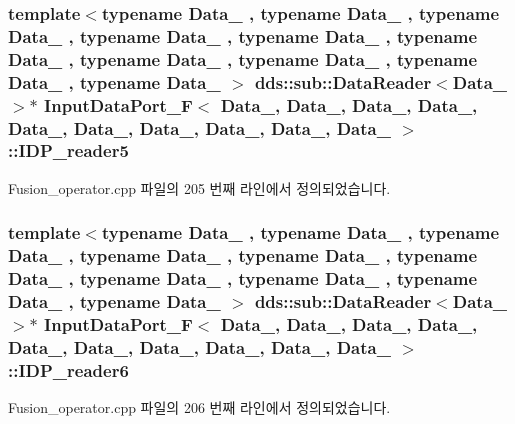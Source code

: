 \subsubsection[{\texorpdfstring{I\+D\+P\+\_\+reader5}{IDP_reader5}}]{\setlength{\rightskip}{0pt plus 5cm}template$<$typename Data\+\_ , typename Data\+\_ , typename Data\+\_ , typename Data\+\_ , typename Data\+\_ , typename Data\+\_ , typename Data\+\_ , typename Data\+\_ , typename Data\+\_ , typename Data\+\_ $>$ dds\+::sub\+::\+Data\+Reader$<$Data\+\_$>$$\ast$ {\bf Input\+Data\+Port\+\_\+F}$<$ Data\+\_, Data\+\_, Data\+\_, Data\+\_, Data\+\_, Data\+\_, Data\+\_, Data\+\_, Data\+\_, Data\+\_ $>$\+::I\+D\+P\+\_\+reader5}\hypertarget{classInputDataPort__F_a5fd5d86cc8ddc3221b09f0c362c00b79}{}\label{classInputDataPort__F_a5fd5d86cc8ddc3221b09f0c362c00b79}


Fusion\+\_\+operator.\+cpp 파일의 205 번째 라인에서 정의되었습니다.

\subsubsection[{\texorpdfstring{I\+D\+P\+\_\+reader6}{IDP_reader6}}]{\setlength{\rightskip}{0pt plus 5cm}template$<$typename Data\+\_ , typename Data\+\_ , typename Data\+\_ , typename Data\+\_ , typename Data\+\_ , typename Data\+\_ , typename Data\+\_ , typename Data\+\_ , typename Data\+\_ , typename Data\+\_ $>$ dds\+::sub\+::\+Data\+Reader$<$Data\+\_$>$$\ast$ {\bf Input\+Data\+Port\+\_\+F}$<$ Data\+\_, Data\+\_, Data\+\_, Data\+\_, Data\+\_, Data\+\_, Data\+\_, Data\+\_, Data\+\_, Data\+\_ $>$\+::I\+D\+P\+\_\+reader6}\hypertarget{classInputDataPort__F_a32834a466932265f79cf2b3bab07acd8}{}\label{classInputDataPort__F_a32834a466932265f79cf2b3bab07acd8}


Fusion\+\_\+operator.\+cpp 파일의 206 번째 라인에서 정의되었습니다.


